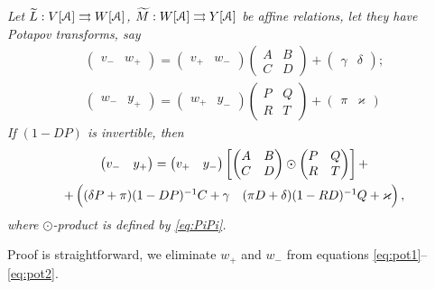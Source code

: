 \documentclass[]{amsart}
\def\kappa{\varkappa}
\def\cA{\EuScript A}
\def\R {{\mathbb R }}
\def\C {{\mathbb C }}
\def\wt{\widetilde}
\def\sm{\smallskip}
\begin{document}
{\it 
Let $\wt L:V[\cA]\tto W[\cA]$, $\wt M:W[\cA]\tto Y[\cA]$
be affine relations, let they have Potapov transforms,
say
\begin{align}
\begin{pmatrix}
v_-& w_+
\end{pmatrix}=
\begin{pmatrix}
v_+& w_-
\end{pmatrix}
\begin{pmatrix}
A&B\\C&D\end{pmatrix}+
\begin{pmatrix}\gamma&\delta
\end{pmatrix};
\label{eq:pot1}
\\
\begin{pmatrix}
w_-& y_+
\end{pmatrix}=
\begin{pmatrix}
w_+& y_-
\end{pmatrix}
\begin{pmatrix}
P&Q\\R&T
\end{pmatrix}+
\begin{pmatrix}
\pi&\kappa
\end{pmatrix}
\label{eq:pot2}
\end{align}
If $(1-DP)$ is invertible, then
\begin{multline}
\begin{pmatrix}
v_-& y_+
\end{pmatrix}=\begin{pmatrix}
v_+& y_-
\end{pmatrix} \left[ \begin{pmatrix}
			A&B\\C&D
		\end{pmatrix} \odot 	\begin{pmatrix}
			P&Q\\R&T
		\end{pmatrix}\right]
		+\\+
		\begin{pmatrix}(\delta P+\pi)(1-DP)^{-1}C+\gamma
		&(\pi D+\delta) (1-RD)^{-1}Q+\kappa\vphantom{\Bigl|}
		\end{pmatrix},
		\label{eq:affine-product}
\end{multline}
where $\odot$-product is defined by \eqref{eq:PiPi}.}

\sm

Proof is straightforward, we eliminate $w_+$ and $w_-$ from 
equations \eqref{eq:pot1}--\eqref{eq:pot2}.
\end{document}
